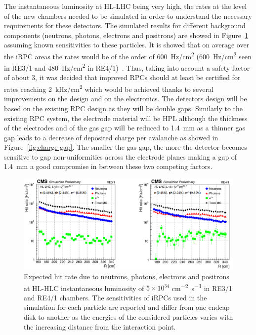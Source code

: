 	The instantaneous luminosity at HL-LHC being very high, the rates at the level of the new chambers needed to be simulated in order to understand the necessary requirements for these detectors. The simulated results for different background components (neutrons, photons, electrons and positrons) are showed in Figure~\ref{fig:iRPC-Rate} assuming known sensitivities to these particles. It is showed that on average over the iRPC areas the rates would be of the order of \SI{600}{Hz/cm^2} (\SI{600}{Hz/cm^2} seen in RE3/1 and \SI{480}{Hz/cm^2} in RE4/1)~\cite{ANDREA2018}. Thus, taking into account a safety factor of about 3, it was decided that improved RPCs should at least be certified for rates reaching \SI{2}{kHz/cm^2} which would be achieved thanks to several improvements on the design and on the electronics. The detectors design will be based on the existing RPC design as they will be double gaps. Similarly to the existing RPC system, the electrode material will be HPL although the thickness of the electrodes and of the gas gap will be reduced to \SI{1.4}{mm} as a thinner gas gap leads to a decrease of deposited charge per avalanche as showed in Figure~\ref{fig:charge-gap}. The smaller the gas gap, the more the detector becomes sensitive to gap non-uniformities across the electrode planes making a gap of \SI{1.4}{mm} a good compromise in between these two competing factors.

	\begin{figure}[H]
		\centering
		\includegraphics[width=\textwidth]{fig/chapt3/RPC-Sim-HL-LHC_Rate.png}
		\caption{\label{fig:iRPC-Rate} Expected hit rate due to neutrons, photons, electrons and positrons at HL-HLC instantaneous luminosity of $5\times10^{34}$ \si{cm^{-2}s^{-1}} in RE3/1 and RE4/1 chambers. The sensitivities of iRPCs used in the simulation for each particle are reported and differ from one endcap disk to another as the energies of the considered particles varies with the increasing distance from the interaction point.}
	\end{figure}

